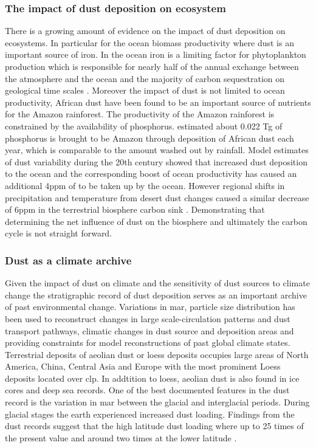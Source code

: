 \subsubsection{The impact of dust deposition on ecosystem}
There is a growing amount of evidence on the impact of dust deposition on ecosystems. In particular for the ocean biomass productivity where dust is an important source of iron. In the ocean iron is a limiting factor for phytoplankton production which is responsible for nearly half of the annual  exchange between the atmosphere and the ocean and the majority of carbon sequestration on geological time scales \parencite{shao2011dust}. Moreover the impact of dust is not limited to ocean productivity, African dust have been found to be an important source of nutrients for the Amazon rainforest. The productivity of the Amazon rainforest is constrained by the availability of phosphorus. \textcite{yu2015fertilizing} estimated about 0.022 Tg of phosphorus is brought to be Amazon through deposition of African dust each year, which is comparable to the amount washed out by rainfall. Model estimates of dust variability during the 20th century showed that increased dust deposition to the ocean and the corresponding boost of ocean productivity has caused an additional 4ppm of  to be taken up by the ocean. However regional shifts in precipitation and temperature from desert dust changes caused a similar decrease of 6ppm  in the terrestrial biosphere carbon sink \parencite{mahowald2010observed}. Demonstrating that determining the net influence of dust on the biosphere and ultimately the carbon cycle is not straight forward.
\subsubsection{Dust as a climate archive}
Given the impact of dust on climate and the sensitivity of dust sources to climate change the stratigraphic record of dust deposition serves as an important archive of past environmental change. Variations in \acrfull{mar}, particle size distribution has been used to reconstruct changes in large scale-circulation patterns and dust transport pathways, climatic changes in dust source and deposition areas and providing constraints for model reconstructions of past global climate states. Terrestrial deposits of aeolian dust or loess deposits occupies large areas of North America, China, Central Asia and Europe with the most prominent Loess deposits located over \acrfull{clp}. In addtition to loess, aeolian dust is also found in ice cores and deep sea records. One of the best documented features in the dust record is the variation in \acrfull{mar} between the glacial and interglacial periods. During glacial stages the earth experienced increased dust loading. Findings from the dust records suggest that the high latitude dust loading where up to 25 times of the present value and around two times at the lower latitude \parencite{shao2011dust}.     

